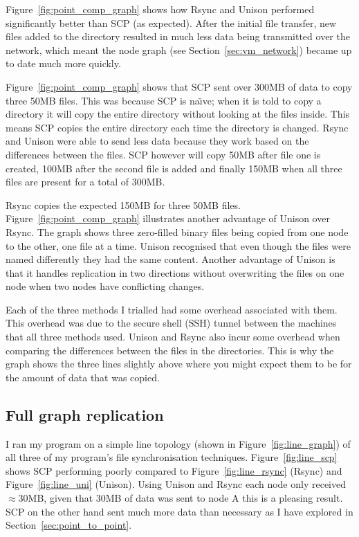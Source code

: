 \documentclass[12pt]{article}
\begin{document}
Figure~\ref{fig:point_comp_graph} shows how 
Rsync and Unison performed significantly better
than SCP (as expected). After the initial file
transfer, new files added to the directory resulted in much less data
being transmitted over the network, which meant the node graph (see
Section~\ref{sec:vm_network})
became up to date much more quickly.

Figure~\ref{fig:point_comp_graph} shows that SCP sent over 300MB
of data to copy three 50MB
files. This was because SCP is na\"{\i}ve; when it is told to copy a
directory it will copy the entire directory without looking at
the files inside.
This means SCP copies the entire directory each time the directory
is changed. Rsync and
Unison were able to send less data because they work based on the
differences between the files. 
SCP however will copy 50MB after file one is created, 100MB after
the second file is added and finally 150MB when all three
files are present for a total of 300MB.

Rsync copies the expected 150MB for three 50MB files.
Figure~\ref{fig:point_comp_graph} illustrates another advantage
of Unison over Rsync. The graph shows three zero-filled
binary files being copied from one node to the other, one file at
a time. Unison recognised that even though the files were named
differently they had the same content. Another advantage of Unison
is that it handles replication in two directions without
overwriting the files on one node when two nodes have
conflicting changes.

Each of the three methods I trialled had some overhead associated
with them. This overhead was due to the secure shell (SSH) tunnel between
the machines that all three methods used. Unison and Rsync also
incur some overhead when comparing the differences between the files
in the directories. This is why the graph shows the three lines
slightly above where you might expect them to be for the amount
of data that was copied.

\subsection{Full graph replication}
\label{sec:full_graph_rep}
I ran my program on a simple line topology (shown in
Figure~\ref{fig:line_graph}) of all three of my
program's file synchronisation techniques.
Figure~\ref{fig:line_scp} shows SCP performing
poorly compared to Figure~\ref{fig:line_rsync} (Rsync)
and Figure~\ref{fig:line_uni} (Unison). Using Unison and
Rsync each node only received $\approx$30MB, given that
30MB of data was sent to node A this is a pleasing
result. SCP on the other hand sent much more data
than necessary as I have explored in 
Section~\ref{sec:point_to_point}. 
\end{document}
